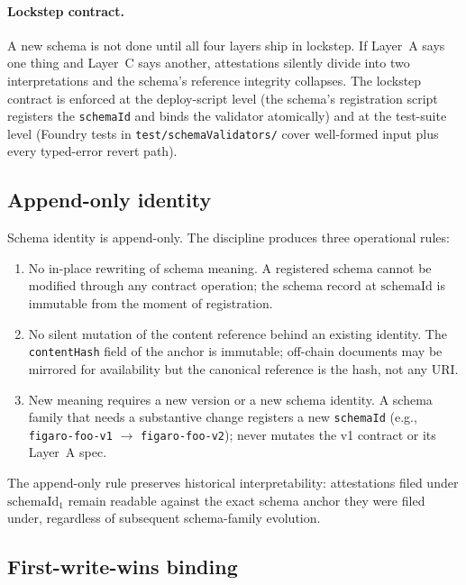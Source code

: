 \documentclass[11pt,a4paper]{article}
\theoremstyle{definition}
\theoremstyle{remark}
\newcommand{\schemaid}{\mathrm{schemaId}}
\begin{document}
\paragraph{Lockstep contract.}
A new schema is not done until all four layers ship in lockstep. If
Layer~A says one thing and Layer~C says another, attestations
silently divide into two interpretations and the schema's reference
integrity collapses. The lockstep contract is enforced at the
deploy-script level (the schema's registration script registers the
\texttt{schemaId} and binds the validator atomically) and at the
test-suite level (Foundry tests in \texttt{test/schemaValidators/}
cover well-formed input plus every typed-error revert path).

\subsection{Append-only identity}

Schema identity is append-only. The discipline produces three
operational rules:

\begin{enumerate}
  \item No in-place rewriting of schema meaning. A registered schema
    cannot be modified through any contract operation; the schema
    record at $\schemaid$ is immutable from the moment of
    registration.
  \item No silent mutation of the content reference behind an
    existing identity. The \texttt{contentHash} field of the anchor
    is immutable; off-chain documents may be mirrored for
    availability but the canonical reference is the hash, not any
    URI.
  \item New meaning requires a new version or a new schema identity.
    A schema family that needs a substantive change registers a new
    \texttt{schemaId} (e.g., \texttt{figaro-foo-v1} $\to$
    \texttt{figaro-foo-v2}); never mutates the v1 contract or its
    Layer~A spec.
\end{enumerate}

The append-only rule preserves historical interpretability:
attestations filed under $\schemaid_1$ remain readable against the
exact schema anchor they were filed under, regardless of subsequent
schema-family evolution.

\subsection{First-write-wins binding}
\end{document}
